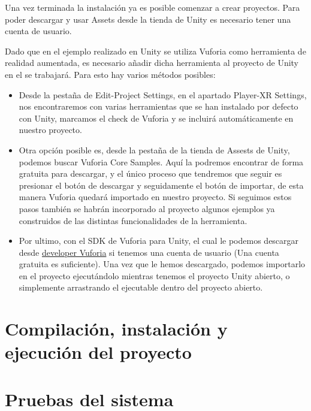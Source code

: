 Una vez terminada la instalación ya es posible comenzar a crear proyectos. 
Para poder descargar y usar Assets desde la tienda de Unity es necesario tener una cuenta de usuario.

Dado que en el ejemplo realizado en Unity se utiliza Vuforia como herramienta de realidad aumentada, es necesario añadir dicha herramienta al proyecto de Unity en el se trabajará. Para esto hay varios métodos posibles:
\begin{itemize}
\item Desde la pestaña de Edit-Project Settings, en el apartado Player-XR Settings, nos encontraremos con varias herramientas que se han instalado por defecto con Unity, marcamos el check de Vuforia y se incluirá automáticamente en nuestro proyecto.

\item Otra opción posible es, desde la pestaña de la tienda de Assests de Unity, podemos buscar Vuforia Core Samples. Aquí la podremos encontrar de forma gratuita para descargar, y el único proceso que tendremos que seguir es presionar el botón de descargar y seguidamente el botón de importar, de esta manera Vuforia quedará importado en nuestro proyecto. Si seguimos estos pasos también se habrán incorporado al proyecto algunos ejemplos ya construidos de las distintas funcionalidades de la herramienta.

\item Por ultimo, con el SDK de Vuforia para Unity, el cual le podemos descargar desde \href{https://developer.vuforia.com/downloads/sdk}{developer Vuforia} si tenemos una cuenta de usuario (Una cuenta gratuita es suficiente). Una vez que le hemos descargado, podemos importarlo en el proyecto ejecutándolo mientras tenemos el proyecto Unity abierto, o simplemente arrastrando el ejecutable dentro del proyecto abierto.	
\end{itemize}


\section{Compilación, instalación y ejecución del proyecto}

\section{Pruebas del sistema}
